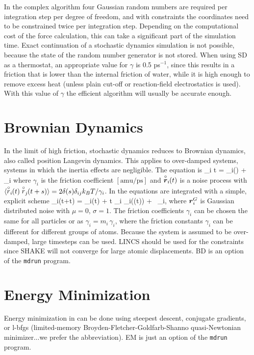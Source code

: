 In the complex algorithm four Gaussian random numbers are required
per integration step per degree of freedom, and with constraints the
coordinates need to be constrained twice per integration step.
Depending on the computational cost of the force calculation,
this can take a significant part of the simulation time.
Exact continuation of a stochastic dynamics simulation is not possible,
because the state of the random number generator is not stored.
When using SD as a thermostat, an appropriate value for $\gamma$ is 0.5 ps$^{-1}$,
since this results in a friction that is lower than the internal friction
of water, while it is high enough to remove excess heat
(unless plain cut-off or reaction-field electrostatics is used).
With this value of $\gamma$ the efficient algorithm will usually be accurate
enough.

\section{Brownian Dynamics}
\label{sec:BD}
In the limit of high friction, stochastic dynamics reduces to 
Brownian dynamics, also called position Langevin dynamics.
This applies to over-damped systems, 
{\ie} systems in which the inertia effects are negligible.
The equation is
\beq
{\de {}_i \over \de t} =  _i() + \vrond_i
\eeq 
where $\gamma_i$ is the friction coefficient $[\mbox{amu/ps}]$ and
$\vrond_i\!\!(t)$  is a noise process with 
$\langle \rond_i\!\!(t) \rond_j\!\!(t+s) \rangle = 
    2 \delta(s) \delta_{ij} k_B T / \gamma_i$.
In {\gromacs} the equations are integrated with a simple, explicit scheme
\beq
{}_i(t+\Delta t) = _i(t) +
        {\Delta t \over \gamma_i} _i((t)) 
        + \, \ruis_i,
\eeq
where $\ruis_i$ is Gaussian distributed noise with $\mu = 0$, $\sigma = 1$.
The friction coefficients $\gamma_i$ can be chosen the same for all
particles or as $\gamma_i = m_i\,\gamma_i$, where the friction constants
$\gamma_i$ can be different for different groups of atoms. 
Because the system is assumed to be over-damped, large timesteps
can be used. LINCS should be used for the constraints since SHAKE
will not converge for large atomic displacements.
BD is an option of the {\tt mdrun} program.

\section{Energy Minimization}
\label{sec:EM}%
Energy minimization in {\gromacs} can be done using steepest descent,
conjugate gradients, or l-bfgs (limited-memory
Broyden-Fletcher-Goldfarb-Shanno quasi-Newtonian minimizer...we
prefer the abbreviation). EM is just an option of the {\tt mdrun}
program.

